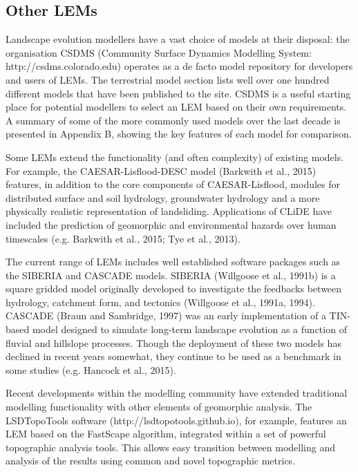\subsection{Other LEMs}

Landscape evolution modellers have a vast choice of models at their disposal: the organisation CSDMS (Community Surface Dynamics Modelling System:  http://csdms.colorado.edu) operates as a de facto model repository for developers and users of LEMs. The terrestrial model section lists well over one hundred different models that have been published to the site. CSDMS is a useful starting place for potential modellers to select an LEM based on their own requirements.  A summary of some of the more commonly used models over the last decade is presented in Appendix B, showing the key features of each model for comparison. 

Some LEMs extend the functionality (and often complexity) of existing models. For example, the CAESAR-Lisflood-DESC model (Barkwith et al., 2015) features, in addition to the core components of CAESAR-Lisflood, modules for distributed surface and soil hydrology, groundwater hydrology and a more physically realistic representation of landsliding. Applications of CLiDE have included the prediction of geomorphic and environmental hazards over human timescales (e.g. Barkwith et al., 2015; Tye et al., 2013). 

The current range of LEMs includes well established software packages such as the SIBERIA and CASCADE models. SIBERIA (Willgoose et al., 1991b) is a square gridded model originally developed to investigate the feedbacks between hydrology, catchment form, and tectonics (Willgoose et al., 1991a, 1994). CASCADE (Braun and Sambridge, 1997) was an early implementation of a TIN-based model designed to simulate long-term landscape evolution as a function of fluvial and hillslope processes.  Though the deployment of these two models has declined in recent years somewhat, they continue to be used as a benchmark in some studies (e.g. Hancock et al., 2015).

Recent developments within the modelling community have extended traditional modelling functionality with other elements of geomorphic analysis.  The LSDTopoTools software (http://lsdtopotools.github.io), for example, features an LEM based on the FastScape algorithm, integrated within a set of powerful topographic analysis tools. This allows easy transition between modelling and analysis of the results using common and novel topographic metrics. 

